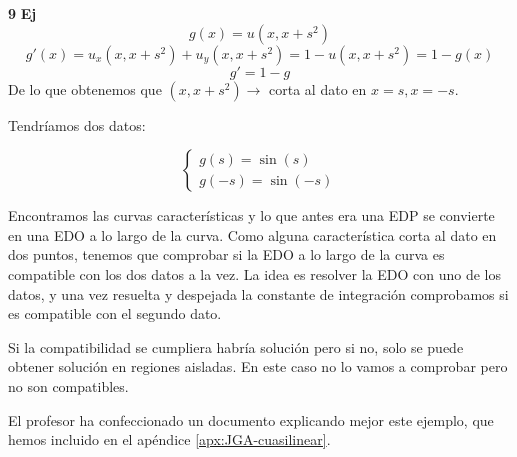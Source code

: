 \begin{example}{\bf 9}
		\textbf{Ej}
		\[g(x) = u(x,x+s^2)\]
		\[g'(x) = u_x (x,x+s^2) + u_y(x,x+s^2) = 1 - u(x,x+s^2) = 1 - g(x)\]
		\[g' = 1-g\]
		De lo que obtenemos que $(x,x+s^2) \rightarrow $ corta al dato en $x=s, x=-s$.

		Tendríamos dos datos:

		\[
		\begin{cases}
		g(s) = \sin(s) \\
		g(-s) = \sin(-s)
		\end{cases}
		\]

		Encontramos las curvas características y lo que antes era una EDP se convierte en una EDO a lo largo de la curva. Como alguna característica corta al dato en dos puntos, tenemos que comprobar si la EDO a lo largo de la curva es compatible con los dos datos a la vez. La idea es resolver la EDO con uno de los datos, y una vez resuelta y despejada la constante de integración comprobamos si es compatible con el segundo dato.

		Si la compatibilidad se cumpliera habría solución pero si no, solo se puede obtener solución en regiones aisladas. En este caso no lo vamos a comprobar pero no son compatibles.

	\end{example}

	\obs El profesor ha confeccionado un documento explicando mejor este ejemplo, que hemos incluido en el apéndice \ref{apx:JGA-cuasilinear}.
